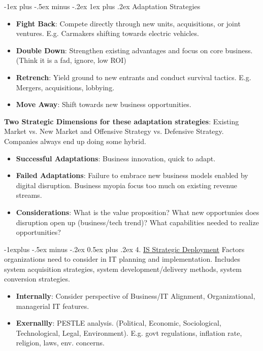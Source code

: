 \documentclass[12pt, landscape]{article}
\makeatletter
\renewcommand{\subsection}{\@startsection{subsection}{2}{0mm}%
                                {-1explus -.5ex minus -.2ex}%
                                {0.5ex plus .2ex}%
                                {\normalfont\normalsize\bfseries}}
\renewcommand{\subsubsection}{\@startsection{subsubsection}{3}{0mm}%
                                {-1ex plus -.5ex minus -.2ex}%
                                {1ex plus .2ex}%
                                {\normalfont\small\bfseries}}
\makeatother
\begin{document}
\begin{multicols*}{3}
\subsubsection{Adaptation Strategies}
\begin{itemize}
    \item \textbf{Fight Back}: Compete directly through new units, acquisitions, or joint ventures. E.g. Carmakers shifting towards electric vehicles.
    \item \textbf{Double Down}: Strengthen existing advantages and focus on core business. (Think it is a fad, ignore, low ROI)
    \item \textbf{Retrench}: Yield ground to new entrants and conduct survival tactics. E.g. Mergers, acquisitions, lobbying.
    \item \textbf{Move Away}: Shift towards new business opportunities.
\end{itemize}
\textbf{Two Strategic Dimensions for these adaptation strategies}: Existing Market vs. New Market and Offensive Strategy vs. Defensive Strategy. Companies always end up doing some hybrid.
\begin{itemize}
\item \textbf{Successful Adaptations}: Business innovation, quick to adapt.
\item \textbf{Failed Adaptations}:  Failure to embrace new business models enabled by digital disruption. Business myopia focus too much on existing revenue streams.
\item \textbf{Considerations}: What is the value proposition? What new opportunies does disruption open up (business/tech trend)? What capabilities needed to realize opportunities?
\end{itemize}

\subsection{4. \underline{IS Strategic Deployment}}
Factors organizations need to consider in IT planning and implementation. Includes system acquisition strategies, system development/delivery methods, system conversion strategies. 
\begin{itemize}
\item \textbf{Internally}: Consider perspective of Business/IT Alignment, Organizational, managerial IT features.
\item \textbf{Exernallly}: PESTLE analysis. (Political, Economic, Sociological, Technological, Legal, Environment). E.g. govt regulations, inflation rate, religion, laws, env. concerns.
\end{itemize}



\end{multicols*}
\end{document}
